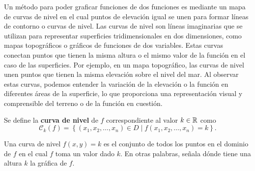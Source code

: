 Un método para poder graficar funciones de dos funciones es mediante un mapa de curvas de nivel en el cual puntos de elevación igual se unen para formar líneas de contorno o curvas de nivel. Las curvas de nivel son líneas imaginarias que se utilizan para representar superficies tridimensionales en dos dimensiones, como mapas topográficos o gráficos de funciones de dos variables. Estas curvas conectan puntos que tienen la misma altura o el mismo valor de la función en el caso de las superficies. Por ejemplo, en un mapa topográfico, las curvas de nivel unen puntos que tienen la misma elevación sobre el nivel del mar. Al observar estas curvas, podemos entender la variación de la elevación o la función en diferentes áreas de la superficie, lo que proporciona una representación visual y comprensible del terreno o de la función en cuestión. %

\begin{definition}
    Se define la \textbf{curva de nivel} de $f$ correspondiente al valor $k \in \RR$ como
    $$\mathcal{C}_k(f) = \left\{ (x_1, x_2, \dots, x_n) \in D \mid f(x_1, x_2, \dots, x_n) = k \right\}.$$
\end{definition}

\begin{observation}
    Una curva de nivel $f(x, y) = k$ es el conjunto de todos los puntos en el dominio de $f$ en el cual $f$ toma un valor dado $k$. En otras palabras, señala dónde tiene una altura $k$ la gráfica de $f$.
\end{observation}

